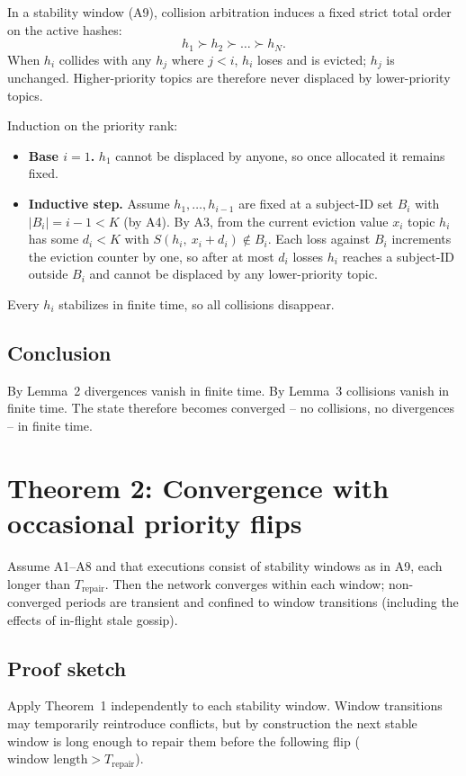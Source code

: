 In a stability window (A9), collision arbitration induces a fixed strict
total order on the active hashes:
\[
    h_1 \succ h_2 \succ \dots \succ h_N.
\]
When $h_i$ collides with any $h_j$ where $j < i$, $h_i$ loses and is
evicted; $h_j$ is unchanged. Higher-priority topics are therefore never
displaced by lower-priority topics.

Induction on the priority rank:
\begin{itemize}
    \item \textbf{Base $i = 1$.} $h_1$ cannot be displaced by anyone, so
    once allocated it remains fixed.
    \item \textbf{Inductive step.} Assume $h_1, \dots, h_{i-1}$ are fixed
    at a subject-ID set $B_i$ with $|B_i| = i - 1 < K$ (by A4). By A3,
    from the current eviction value $x_i$ topic $h_i$ has some $d_i < K$
    with $S(h_i,\ x_i + d_i) \notin B_i$. Each loss against $B_i$
    increments the eviction counter by one, so after at most $d_i$ losses
    $h_i$ reaches a subject-ID outside $B_i$ and cannot be displaced by
    any lower-priority topic.
\end{itemize}

Every $h_i$ stabilizes in finite time, so all collisions disappear.

\subsection*{Conclusion}

By Lemma~2 divergences vanish in finite time. By Lemma~3 collisions vanish
in finite time. The state therefore becomes converged -- no collisions, no
divergences -- in finite time.

\section{Theorem 2: Convergence with occasional priority flips}

Assume A1--A8 and that executions consist of stability windows as in A9,
each longer than $T_{\mathrm{repair}}$. Then the network converges within
each window; non-converged periods are transient and confined to window
transitions (including the effects of in-flight stale gossip).

\subsection*{Proof sketch}

Apply Theorem~1 independently to each stability window. Window transitions
may temporarily reintroduce conflicts, but by construction the next stable
window is long enough to repair them before the following flip
($\text{window length} > T_{\mathrm{repair}}$).

